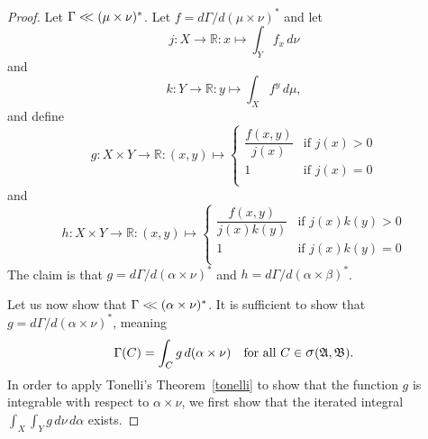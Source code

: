 \documentclass[
twoside=true,
paper=letter,
fontsize=11pt,
pagesize=auto,
leqno,
openany,
headsepline,
overfullrule,
]{scrbook}
\theoremstyle{plain}
\theoremstyle{plain}
\theoremstyle{definition}
\theoremstyle{bfnoteitalic}
\theoremstyle{bfnoteroman}
\newcommand{\sigalg}[1]{\mathfrak{#1}}
\newcommand{\sagb}{\mathop{\hbox{\large{$\sigma$}}}\nolimits}
\newcommand{\R}{\mathbb{R}}
\newcommand{\sigmaalgebra}{\sigalg{A}}
\newcommand{\sigmaalgebraii}{\sigalg{B}}
\newcommand{\productsig}[2]{\sagb(#1,#2)}
\newcommand{\funcg}{g}
\newcommand{\funck}{k}
\newcommand{\funcj}{j}
\newcommand{\function}{f}
\newcommand{\functionii}{g}
\newcommand{\functioniii}{h}
\newcommand{\measurespace}{X}
\newcommand{\measurespaceii}{Y}
\newcommand{\mspaceelt}{x}
\newcommand{\mspaceeltii}{y}
\newcommand{\abscont}{\mathrel{< \kern-3.5pt <}}
\newcommand{\measure}{\mu}
\newcommand{\measureii}{\nu}
\newcommand{\setiii}{C}
\newcommand{\measonprod}{\Gamma}%
\newcommand{\marginalone}{\alpha}%
\newcommand{\marginaltwo}{\beta}%
\begin{document}
\begin{proof}
Let
$\measonprod \abscont (\measure\times\measureii)^*$.
Let
$\function = d\measonprod / d(\measure\times\measureii)^*$
and let
\[
\funcj : \measurespace\to\R
: \mspaceelt \mapsto \int_\measurespaceii \function_\mspaceelt \, d\measureii
\]
and
\[
\funck : \measurespaceii\to\R
: \mspaceeltii \mapsto \int_\measurespace \function^\mspaceeltii \, d\measure,
\]
and define
\[
\functionii : \measurespace\times\measurespaceii \to \R
: (\mspaceelt,\mspaceeltii) \mapsto
\begin{cases}
\dfrac{\function(\mspaceelt,\mspaceeltii)}{\funcj(\mspaceelt)}
& \text{if $\funcj(\mspaceelt) > 0$} \\
1 
& \text{if $\funcj(\mspaceelt)=0$} \\
\end{cases}
\]
and
\[
\functioniii : \measurespace\times\measurespaceii \to \R
: (\mspaceelt,\mspaceeltii) \mapsto
\begin{cases}
\dfrac{\function(\mspaceelt,\mspaceeltii)} 
{\funcj(\mspaceelt)\funck(\mspaceeltii)}
& \text{if $\funcj(\mspaceelt)\funck(\mspaceeltii) > 0$} \\
1 
& \text{if $\funcj(\mspaceelt)\funck(\mspaceeltii)=0$} \\
\end{cases}
\]
The claim is that 
$\functionii
=
d\measonprod / d(\marginalone\times\measureii)^*$
and
$\functioniii
=
d\measonprod / d(\marginalone\times\marginaltwo)^*$.


Let us now show that 
$\measonprod \abscont (\marginalone\times\measureii)^*$.
It is sufficient to show that 
$\functionii
=
d\measonprod / d(\marginalone\times\measureii)^*$,
meaning
\[
\measonprod(\setiii)
=
\int_\setiii\functionii
\,d(\marginalone\times\measureii)
\quad
\text{for all $\setiii\in
\productsig{\sigmaalgebra}{\sigmaalgebraii}$}.
\]
In order to apply Tonelli's Theorem~\ref{tonelli} to show that the function $\functionii$ is integrable with respect to 
$\marginalone\times\measureii$, we first show that  the iterated integral
$\int_\measurespace\int_\measurespaceii \funcg \,d\measureii\,d\marginalone$
exists.


\end{proof}
\end{document}

